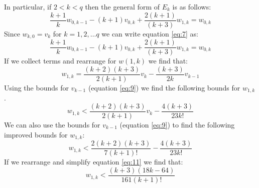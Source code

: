 \documentclass[12pt]{article} %
\theoremstyle{definition}
\begin{document}
In particular, if $2<k<q$ then the general form of $E_{k}$ is as follows:
\begin{equation}\label{eq:7}   
 \frac{k+1}{k}w_{0,k-1} - (k+1)v_{0,k} + \frac{2(k+1)}{(k+3)}w_{1,k} = w_{0,k}
\end{equation}
Since $w_{k,0} = v_{k}$ for $k = 1,2,\dots q$ we can write equation \ref{eq:7} as:
\[ \frac{k+1}{k}w_{0,k-1} - (k+1)v_{0,k} + \frac{2(k+1)}{(k+3)}w_{1,k} = w_{0,k}\]
If we collect terms and rearrange for $w(1,k)$ we find that:
\begin{equation}\label{eq:8}
 w_{1,k} = \frac{(k+2)(k+3)}{2(k+1)}v_{k} - \frac{(k+3)}{2k}v_{k-1}
\end{equation}
Using the bounds for $v_{k-1}$ (equation \ref{eq:9}) we find the following bounds for $w_{1,k}$. 
\begin{equation}\label{eq:10}
w_{1,k} < \frac{(k+2)(k+3)}{2(k+1)}v_{k} - \frac{4(k+3)}{23k!}
\end{equation}
We can also use the bounds for $v_{k-1}$ (equation \ref{eq:9}) to find the following improved bounds for $w_{1,k}$:
\begin{equation}\label{eq:11}
 w_{1,k} < \frac{2(k+2)(k+3)}{7(k+1)!} - \frac{4(k+3)}{23k!}
\end{equation}
If we rearrange and simplify equation \ref{eq:11} we find that:
\[ w_{1,k} < \frac{(k+3)(18k - 64)}{161(k+1)!} \]






\end{document}
